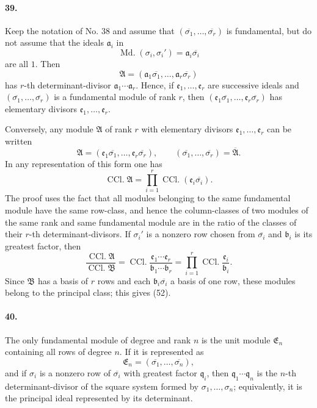 \documentclass[11pt]{article}
\newcommand{\Md}{\operatorname{Md.}}
\newcommand{\Kkl}{\operatorname{CCl.}}
\begin{document}
\paragraph{39.}
Keep the notation of No. 38 and assume that $(\overline{\sigma_1},
\ldots,
\overline{\sigma_r})$ is fundamental, but do not assume that the ideals $\mathfrak a_i$ in
\[
\Md(\sigma_i,
\sigma_i')=\mathfrak a_i\overline{\sigma_i}
\]
are all $1$. Then
\[
\mathfrak A=(\mathfrak a_1\overline{\sigma_1},
\ldots,
\mathfrak a_r\overline{\sigma_r})
\]
has $r$-th determinant-divisor $\mathfrak a_1\cdots\mathfrak a_r$. Hence, if $\mathfrak e_1,
\ldots,
\mathfrak e_r$ are successive ideals and $(\overline{\sigma_1},
\ldots,
\overline{\sigma_r})$ is a fundamental module of rank $r$, then $(\mathfrak e_1\overline{\sigma_1},
\ldots,
\mathfrak e_r\overline{\sigma_r})$ has elementary divisors $\mathfrak e_1,
\ldots,
\mathfrak e_r$.

Conversely, any module $\mathfrak A$ of rank $r$ with elementary divisors $\mathfrak e_1,
\ldots,
\mathfrak e_r$ can be written
\[
\mathfrak A=(\mathfrak e_1\overline{\sigma_1},
\ldots,
\mathfrak e_r\overline{\sigma_r}),
\qquad
(\overline{\sigma_1},
\ldots,
\overline{\sigma_r})=\overline{\mathfrak A}.
\]
In any representation of this form one has
\begin{equation}
\Kkl\mathfrak A=\prod_{i=1}^{r}\Kkl(\mathfrak e_i\overline{\sigma_i}).
\tag{52}
\end{equation}
The proof uses the fact that all modules belonging to the same fundamental module have the same row-class, and hence the column-classes of two modules of the same rank and same fundamental module are in the ratio of the classes of their $r$-th determinant-divisors. If $\sigma_i'$ is a nonzero row chosen from $\overline{\sigma_i}$ and $\mathfrak b_i$ is its greatest factor, then
\begin{equation}
\frac{\Kkl\mathfrak A}{\Kkl\mathfrak B}
=\Kkl\frac{\mathfrak e_1\cdots\mathfrak e_r}{\mathfrak b_1\cdots\mathfrak b_r}
=\prod_{i=1}^{r}\Kkl\frac{\mathfrak e_i}{\mathfrak b_i}.
\tag{51}
\end{equation}
Since $\mathfrak B$ has a basis of $r$ rows and each $\mathfrak b_i\overline{\sigma_i}$ a basis of one row, these modules belong to the principal class; this gives (52).

\paragraph{40.}
The only fundamental module of degree and rank $n$ is the unit module $\mathfrak E_n$ containing all rows of degree $n$. If it is represented as
\[
\mathfrak E_n=(\overline{\sigma_1},
\ldots,
\overline{\sigma_n}),
\]
and if $\sigma_i$ is a nonzero row of $\overline{\sigma_i}$ with greatest factor $\mathfrak q_i$, then $\mathfrak q_1\cdots\mathfrak q_n$ is the $n$-th determinant-divisor of the square system formed by $\sigma_1,
\ldots,
\sigma_n$; equivalently, it is the principal ideal represented by its determinant.
\end{document}
